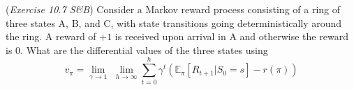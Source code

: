 (\textit{Exercise 10.7 S\&B})
Consider a Markov reward process consisting of a ring of three states A, B,
and C, with state transitions going deterministically around the ring.
A reward of $+1$ is received upon arrival in A and otherwise the reward is $0$.
What are the differential values of the three states using
$$ v_{\pi} = \underset{\gamma \rightarrow 1}{\lim}\,\, \underset{h \rightarrow \infty}{\lim} \sum_{t=0}^{h} \gamma^{t}\left(  \mathbb{E}_{\pi} [R_{t+1} | S_{0} = s] - r(\pi)\right)$$